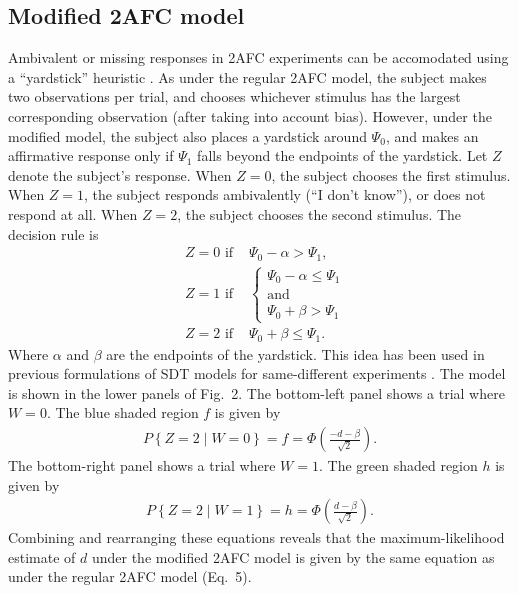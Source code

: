 \documentclass[man]{apa6}
\begin{document}
\subsection{Modified 2AFC model}
Ambivalent or missing responses in 2AFC experiments can be accomodated using a ``yardstick'' heuristic \parencite{decarlosignal2013}. As under the regular 2AFC model, the subject makes two observations per trial, and chooses whichever stimulus has the largest corresponding observation (after taking into account bias). However, under the modified model, the subject also places a yardstick around $\Psi_0$, and makes an affirmative response only if $\Psi_1$ falls beyond the endpoints of the yardstick. Let $Z$ denote the subject's response. When $Z=0$, the subject chooses the first stimulus. When $Z=1$, the subject responds ambivalently (``I don't know''), or does not respond at all. When $Z=2$, the subject chooses the second stimulus. The decision rule is
\begin{eqnarray*}
&Z=0\textrm{ if }&\Psi_0-\alpha>\Psi_1\textrm{,}\\
&Z=1\textrm{ if }&\left\{ \begin{array}{cl}
\Psi_0-\alpha{}\le\Psi_1\\
\textrm{and}\\
\Psi_0+\beta>\Psi_1
       \end{array} \right.\\
&Z=2\textrm{ if }&\Psi_0+\beta{}\le\Psi_1\textrm{.}
\end{eqnarray*}
Where $\alpha$ and $\beta$ are the endpoints of the yardstick. This idea has been used in previous formulations of SDT models for same-different experiments \parencite{decarlosignal2013}. The model is shown in the lower panels of Fig.~2. The bottom-left panel shows a trial where $W=0$. The blue shaded region $f$ is given by
\begin{eqnarray*}
P\left\{Z=2\mid{}W=0\right\}=f=\Phi\left(\frac{-d-\beta}{\sqrt{2}}\right)\textrm{.}
\end{eqnarray*}
The bottom-right panel shows a trial where $W=1$. The green shaded region $h$ is given by
\begin{eqnarray*}
P\left\{Z=2\mid{}W=1\right\}=h=\Phi\left(\frac{d-\beta}{\sqrt{2}}\right)\textrm{.}
\end{eqnarray*}Combining and rearranging these equations reveals that the maximum-likelihood estimate of $d$ under the modified 2AFC model is given by the same equation as under the regular 2AFC model (Eq.~5).
\end{document}
